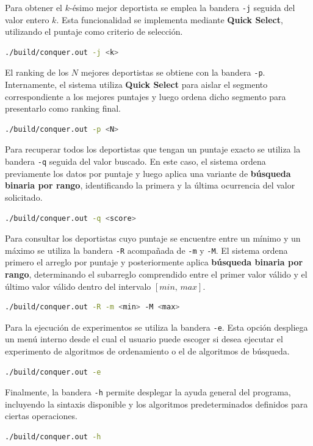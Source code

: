 Para obtener el $k$-ésimo mejor deportista se emplea la bandera \texttt{-j} seguida del valor entero $k$. Esta funcionalidad se implementa mediante \textbf{Quick Select}, utilizando el puntaje como criterio de selección.
\begin{lstlisting}[language=bash, style=CodeStyle]
./build/conquer.out -j <k>
\end{lstlisting}

El ranking de los $N$ mejores deportistas se obtiene con la bandera \texttt{-p}. Internamente, el sistema utiliza \textbf{Quick Select} para aislar el segmento correspondiente a los mejores puntajes y luego ordena dicho segmento para presentarlo como ranking final.
\begin{lstlisting}[language=bash, style=CodeStyle]
./build/conquer.out -p <N>
\end{lstlisting}

Para recuperar todos los deportistas que tengan un puntaje exacto se utiliza la bandera \texttt{-q} seguida del valor buscado. En este caso, el sistema ordena previamente los datos por puntaje y luego aplica una variante de \textbf{búsqueda binaria por rango}, identificando la primera y la última ocurrencia del valor solicitado.
\begin{lstlisting}[language=bash, style=CodeStyle]
./build/conquer.out -q <score>
\end{lstlisting}

Para consultar los deportistas cuyo puntaje se encuentre entre un mínimo y un máximo se utiliza la bandera \texttt{-R} acompañada de \texttt{-m} y \texttt{-M}. El sistema ordena primero el arreglo por puntaje y posteriormente aplica \textbf{búsqueda binaria por rango}, determinando el subarreglo comprendido entre el primer valor válido y el último valor válido dentro del intervalo $[\textit{min},\,\textit{max}]$.
\begin{lstlisting}[language=bash, style=CodeStyle]
./build/conquer.out -R -m <min> -M <max>
\end{lstlisting}

Para la ejecución de experimentos se utiliza la bandera \texttt{-e}. Esta opción despliega un menú interno desde el cual el usuario puede escoger si desea ejecutar el experimento de algoritmos de ordenamiento o el de algoritmos de búsqueda.
\begin{lstlisting}[language=bash, style=CodeStyle]
./build/conquer.out -e
\end{lstlisting}

Finalmente, la bandera \texttt{-h} permite desplegar la ayuda general del programa, incluyendo la sintaxis disponible y los algoritmos predeterminados definidos para ciertas operaciones.
\begin{lstlisting}[language=bash, style=CodeStyle]
./build/conquer.out -h
\end{lstlisting}

